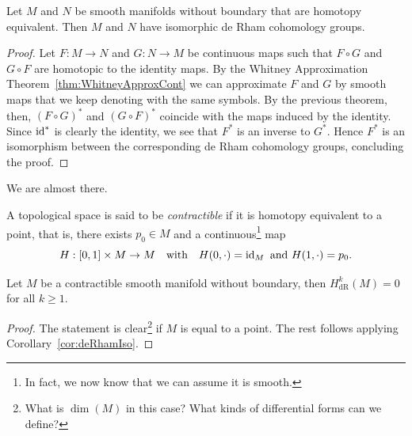 \begin{corollary}\label{cor:deRhamIso}
	Let $M$ and $N$ be smooth manifolds without boundary that are homotopy equivalent. Then $M$ and $N$ have isomorphic de Rham cohomology groups.
\end{corollary}
\begin{proof}
	Let $F:M\to N$ and $G:N\to M$ be continuous maps such that $F\circ G$ and $G\circ F$ are homotopic to the identity maps.
	By the Whitney Approximation Theorem~\ref{thm:WhitneyApproxCont} we can approximate $F$ and $G$ by smooth maps that we keep denoting with the same symbols.
	By the previous theorem, then, $(F\circ G)^*$ and $(G\circ F)^*$ coincide with the maps induced by the identity.
	Since $\operatorname{id}^*$ is clearly the identity, we see that $F^*$ is an inverse to $G^*$.
	Hence $F^*$ is an isomorphism between the corresponding de Rham cohomology groups,
	concluding the proof.
\end{proof}

We are almost there.

\begin{definition}
	A topological space is said to be \emph{contractible} if it is homotopy equivalent to a point, that is, there exists $p_0\in M$ and a continuous\footnote{In fact, we now know that we can assume it is smooth.} map
	\begin{equation}
		H:[0,1]\times M \to M
		\quad\mbox{with}\quad
		H(0, \cdot) = \operatorname{id}_M
		\mbox{ and }
		H(1, \cdot) = p_0.
	\end{equation}
\end{definition}

\begin{corollary}
	Let $M$ be a contractible smooth manifold without boundary, then $H^k_{\mathrm{dR}}(M)=0$ for all $k\geq 1$.
\end{corollary}
\begin{proof}
	The statement is clear\footnote{What is $\dim(M)$ in this case? What kinds of differential forms can we define?} if $M$ is equal to a point.
	The rest follows applying Corollary~\ref{cor:deRhamIso}.
\end{proof}


